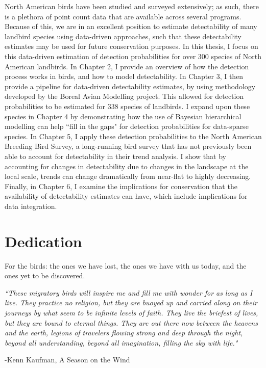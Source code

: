\par North American birds have been studied and surveyed extensively; as such, there is a plethora of point count data that are available across several programs. Because of this, we are in an excellent position to estimate detectability of many landbird species using data-driven approaches, such that these detectability estimates may be used for future conservation purposes. In this thesis, I focus on this data-driven estimation of detection probabilities for over 300 species of North American landbirds. In Chapter 2, I provide an overview of how the detection process works in birds, and how to model detectability. In Chapter 3, I then provide a pipeline for data-driven detectability estimates, by using methodology developed by the Boreal Avian Modelling project. This allowed for detection probabilities to be estimated for 338 species of landbirds. I expand upon these species in Chapter 4 by demonstrating how the use of Bayesian hierarchical modelling can help ``fill in the gaps" for detection probabilities for data-sparse species. In Chapter 5, I apply these detection probabilities to the North American Breeding Bird Survey, a long-running bird survey that has not previously been able to account for detectability in their trend analysis. I show that by accounting for changes in detectability due to changes in the landscape at the local scale, trends can change dramatically from near-flat to highly decreasing. Finally, in Chapter 6, I examine the implications for conservation that the availability of detectability estimates can have, which include implications for data integration.

\chapter*{Dedication}

\par For the birds: the ones we have lost, the ones we have with us today, and the ones yet to be discovered.


\begin{center}
	\centering \textit{``These migratory birds will inspire me and fill me with wonder for as long as I live. They practice no religion, but they are buoyed up and carried along on their journeys by what seem to be infinite levels of faith. They live the briefest of lives, but they are bound to eternal things. They are out there now between the heavens and the earth, legions of travelers flowing strong and deep through the night, beyond all understanding, beyond all imagination, filling the sky with life."}
	
	-Kenn Kaufman, A Season on the Wind
\end{center}

